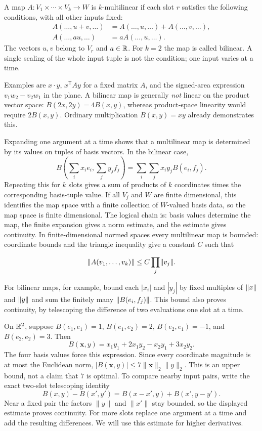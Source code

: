 \begin{definition}
A map $A:V_1\times\cdots\times V_k\to W$ is $k$-multilinear if each
slot $r$ satisfies the following conditions, with all other inputs fixed:
\begin{align*}
A(\ldots,u+v,\ldots)&=A(\ldots,u,\ldots)+A(\ldots,v,\ldots),\\
A(\ldots,au,\ldots)&=aA(\ldots,u,\ldots).
\end{align*}
The vectors $u,v$ belong to $V_r$ and $a\in\mathbb{R}$. For $k=2$ the map is
called bilinear. A single scaling of the whole input tuple is not the
condition; one input varies at a time.
\end{definition}
Examples are $x\cdot y$, $x^{\mathsf T}Ay$ for a fixed matrix $A$, and
the signed-area expression $v_1w_2-v_2w_1$ in the plane. A bilinear map
is generally \emph{not} linear on the product vector space:
$B(2x,2y)=4B(x,y)$, whereas product-space linearity would require
$2B(x,y)$. Ordinary multiplication $B(x,y)=xy$ already demonstrates this.

Expanding one argument at a time shows that a multilinear map is determined
by its values on tuples of basis vectors. In the bilinear case,
\[
B\left(\sum_i x_ie_i,\sum_j y_jf_j\right)
=\sum_i\sum_j x_iy_jB(e_i,f_j).
\]
Repeating this for $k$ slots gives a sum of products of $k$ coordinates
times the corresponding basis-tuple value. If all $V_j$ and $W$ are
finite dimensional, this identifies the map space with a finite collection
of $W$-valued basis data, so the map space is finite dimensional. The
logical chain is: basis values determine the map, the finite expansion
gives a norm estimate, and the estimate gives continuity.
In finite-dimensional normed spaces every
multilinear map is bounded: coordinate bounds and the triangle inequality
give a constant $C$ such that

\[
\lVert A(v_1,\ldots,v_k)\rVert\leq C\prod_j\lVert v_j\rVert.
\]

For bilinear maps, for example, bound each $|x_i|$ and $|y_j|$ by fixed
multiples of $\lVert x\rVert$ and $\lVert y\rVert$ and sum the finitely many
$\lVert B(e_i,f_j)\rVert$. This bound also proves continuity, by telescoping
the difference of two evaluations one slot at a time.

\begin{example}
On $\mathbb{R}^2$, suppose $B(e_1,e_1)=1$, $B(e_1,e_2)=2$,
$B(e_2,e_1)=-1$, and $B(e_2,e_2)=3$. Then
\[
B(\mathbf{x},y)=x_1y_1+2x_1y_2-x_2y_1+3x_2y_2.
\]
The four basis values force this expression. Since every coordinate
magnitude is at most the Euclidean norm,
$|B(\mathbf{x},y)|\leq7\|\mathbf{x}\|_2\|y\|_2$. This is an upper bound, not a
claim that $7$ is optimal. To compare nearby input pairs, write the
exact two-slot telescoping identity
\[
B(x,y)-B(x',y')=B(x-x',y)+B(x',y-y').
\]
Near a fixed pair the factors $\|y\|$ and $\|x'\|$ stay bounded,
so the displayed estimate proves continuity. For more slots replace
one argument at a time and add the resulting differences. We will use
this estimate for higher derivatives.
\end{example}


